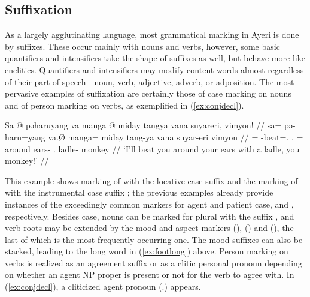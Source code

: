 
\subsection{Suffixation}

As a largely agglutinating language, most grammatical marking in Ayeri is done by 
suffixes. These occur mainly with nouns and verbs,
however, some basic quantifiers and intensifiers take the shape of suffixes as well, but behave
more like enclitics. Quantifiers and intensifiers may modify content words almost regardless of
their part of speech---noun, verb, adjective, adverb, or adposition. The most pervasive
examples of suffixation are certainly those of case marking on nouns and of
person marking on verbs, as exemplified in (\ref{ex:conjdecl}).

\ex\label{ex:conjdecl}\begingl
	\gla Sa @ pəharuyang va manga @ miday tangya vana suyareri, vimyon! //
	\glb sa= pə-haru=yang va.Ø manga= miday tang-ya vana suyar-eri vimyon //
	\glc \PatT{}= \NFut{}-beat=\Fsg{}.\Aarg{} \Ssg{}.\Top{} \Dir{}= around 
		ears-\Loc{} \Ssg{}.\Gen{} ladle-\Ins{} monkey //
	\glft `I'll beat you around your ears with a ladle, you monkey!' //
\endgl\xe

This example shows marking of  with the locative case
suffix  and the marking of  with the
instrumental case suffix ; the previous examples already
provide instances of the exceedingly common markers for agent and patient case,
 and , respectively. Besides case, nouns can
be marked for plural with the suffix , and verb roots may
be extended by the mood and aspect markers  (\Irr{}),
 (\Hab{}) and  (\Neg{}), the last of which is 
the most frequently occurring one. The mood suffixes can also be stacked,
leading to the long word in (\ref{ex:footlong}) above. Person marking on verbs
is realized as an agreement suffix or as a clitic personal pronoun depending on
whether an agent NP proper is present or not for the verb to agree with. In
(\ref{ex:conjdecl}), a cliticized agent pronoun 
(\Fsg{}.\Aarg{}) appears.

